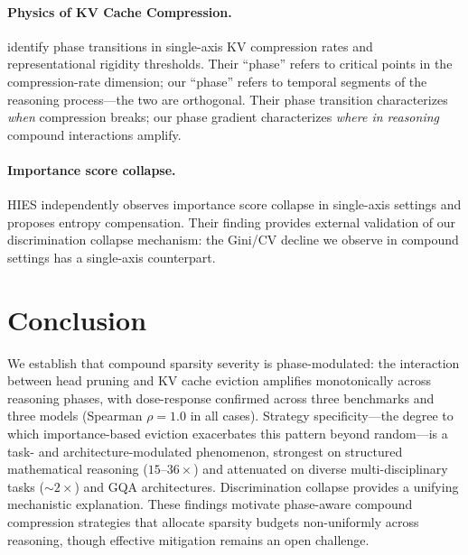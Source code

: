 \documentclass[11pt]{article}
\begin{document}
\paragraph{Physics of KV Cache Compression.} \citet{physics2026} identify phase transitions in single-axis KV compression rates and representational rigidity thresholds. Their ``phase'' refers to critical points in the compression-rate dimension; our ``phase'' refers to temporal segments of the reasoning process---the two are orthogonal. Their phase transition characterizes \emph{when} compression breaks; our phase gradient characterizes \emph{where in reasoning} compound interactions amplify.

\paragraph{Importance score collapse.} HIES \citep{hies2025} independently observes importance score collapse in single-axis settings and proposes entropy compensation. Their finding provides external validation of our discrimination collapse mechanism: the Gini/CV decline we observe in compound settings has a single-axis counterpart.

\section{Conclusion}

We establish that compound sparsity severity is phase-modulated: the interaction between head pruning and KV cache eviction amplifies monotonically across reasoning phases, with dose-response confirmed across three benchmarks and three models (Spearman $\rho=1.0$ in all cases). Strategy specificity---the degree to which importance-based eviction exacerbates this pattern beyond random---is a task- and architecture-modulated phenomenon, strongest on structured mathematical reasoning ($15$--$36\times$) and attenuated on diverse multi-disciplinary tasks ($\sim 2\times$) and GQA architectures. Discrimination collapse provides a unifying mechanistic explanation. These findings motivate phase-aware compound compression strategies that allocate sparsity budgets non-uniformly across reasoning, though effective mitigation remains an open challenge.
\end{document}
